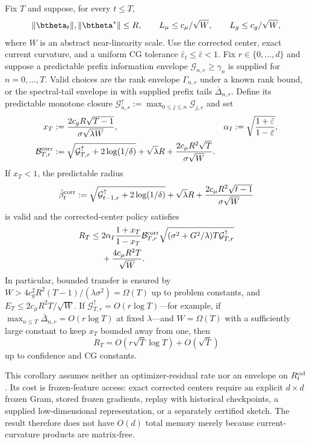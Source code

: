 \begin{corollary}
\label{cor:corrected-near-linear}
Fix $T$ and suppose, for every $t\le T$,
\[
 \|\btheta_t\|,\|\btheta^*\|\le R,\qquad
 L_\mu\le c_\mu/\sqrt W,\qquad L_g\le c_g/\sqrt W,
\]
where $W$ is an abstract near-linearity scale.  Use the corrected center,
exact current curvature, and a uniform CG tolerance
$\bar\varepsilon_t\le\bar\varepsilon<1$.  Fix
$r\in\{0,\ldots,d\}$ and suppose a predictable prefix information envelope
$\mathcal G_{n,r}\ge\gamma_n$ is supplied for $n=0,\ldots,T$.  Valid choices
are the rank envelope $\Gamma_{n,r}$ under a known rank bound, or the
spectral-tail envelope in  with supplied
prefix tails $\bar\Delta_{n,r}$.  Define its predictable monotone closure
$\mathcal G^\uparrow_{n,r}:=\max_{0\le j\le n}\mathcal G_{j,r}$ and set
\begin{align*}
 x_T&:=\frac{2c_gR\sqrt{T-1}}{\sigma\sqrt{\lambda W}},&
 \alpha_I&:=\sqrt{\frac{1+\bar\varepsilon}{1-\bar\varepsilon}},\\
 \mathcal B_{T,r}^{\rm corr}
 &:=\sqrt{\mathcal G^\uparrow_{T,r}+2\log(1/\delta)}+\sqrt\lambda R
 +\frac{2c_\mu R^2\sqrt T}{\sigma\sqrt W}.&&
\end{align*}
If $x_T<1$, the predictable radius
\begin{equation}\label{eq:corrected-near-linear-beta}
 \bar\beta_t^{\rm corr}:=
 \sqrt{\mathcal G^\uparrow_{t-1,r}+2\log(1/\delta)}+\sqrt\lambda R
 +\frac{2c_\mu R^2\sqrt{t-1}}{\sigma\sqrt W}
\end{equation}
is valid and the corrected-center policy satisfies
\begin{equation}\label{eq:corrected-near-linear-regret}
\begin{aligned}
 R_T\le{}&2\alpha_I\frac{1+x_T}{1-x_T}
 \mathcal B_{T,r}^{\rm corr}
 \sqrt{(\sigma^2+G^2/\lambda)T\mathcal G^\uparrow_{T,r}}\\
 &+\frac{4c_\mu R^2T}{\sqrt W}.
\end{aligned}
\end{equation}
In particular, bounded transfer is ensured by
$W>4c_g^2R^2(T-1)/(\lambda\sigma^2)=\Omega(T)$ up to problem constants,
and $E_T\le2c_\mu R^2T/\sqrt W$.  If
$\mathcal G^\uparrow_{T,r}=O(r\log T)$---for example, if
$\max_{n\le T}\bar\Delta_{n,r}=O(r\log T)$ at fixed $\lambda$---and
$W=\Omega(T)$ with
a sufficiently large constant to keep $x_T$ bounded away from one, then
\[
 R_T=O(r\sqrt T\log T)+O(\sqrt T)
\]
up to confidence and CG constants.

This corollary assumes neither an optimizer-residual rate nor an envelope on
$R_t^{\rm col}$.  Its cost is frozen-feature access: exact corrected centers
require an explicit $d\times d$ frozen Gram, stored frozen gradients, replay
with historical checkpoints, a supplied low-dimensional representation, or a
separately certified sketch.  The result therefore does not have $O(d)$ total
memory merely because current-curvature products are matrix-free.
\end{corollary}
